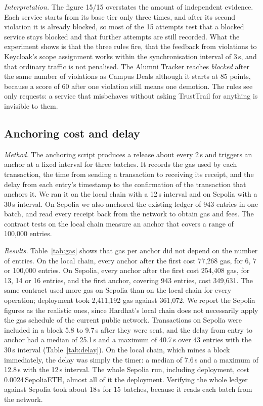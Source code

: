 \emph{Interpretation.} The figure 15/15 overstates the amount of independent evidence. Each service starts from its base tier only three times, and after its second violation it is already blocked, so most of the 15 attempts test that a blocked service stays blocked and that further attempts are still recorded. What the experiment shows is that the three rules fire, that the feedback from violations to Keycloak's scope assignment works within the synchronisation interval of 3\,s, and that ordinary traffic is not penalised. The Alumni Tracker reaches \emph{blocked} after the same number of violations as Campus Deals although it starts at 85 points, because a score of 60 after one violation still means one demotion. The rules see only requests: a service that misbehaves without asking TrustTrail for anything is invisible to them.

\subsection{Anchoring cost and delay}
\label{sec:eval-anchoring}
\emph{Method.} The anchoring script produces a release about every 2\,s and triggers an anchor at a fixed interval for three batches. It records the gas used by each transaction, the time from sending a transaction to receiving its receipt, and the delay from each entry's timestamp to the confirmation of the transaction that anchors it. We ran it on the local chain with a 12\,s interval and on Sepolia with a 30\,s interval. On Sepolia we also anchored the existing ledger of 943 entries in one batch, and read every receipt back from the network to obtain gas and fees. The contract tests on the local chain measure an anchor that covers a range of 100{,}000 entries.

\emph{Results.} Table~\ref{tab:gas} shows that gas per anchor did not depend on the number of entries. On the local chain, every anchor after the first cost 77{,}268 gas, for 6, 7 or 100{,}000 entries. On Sepolia, every anchor after the first cost 254{,}408 gas, for 13, 14 or 16 entries, and the first anchor, covering 943 entries, cost 349{,}631. The same contract used more gas on Sepolia than on the local chain for every operation; deployment took 2{,}411{,}192 gas against 361{,}072. We report the Sepolia figures as the realistic ones, since Hardhat's local chain does not necessarily apply the gas schedule of the current public network. Transactions on Sepolia were included in a block 5.8 to 9.7\,s after they were sent, and the delay from entry to anchor had a median of 25.1\,s and a maximum of 40.7\,s over 43 entries with the 30\,s interval (Table~\ref{tab:delay}). On the local chain, which mines a block immediately, the delay was simply the timer: a median of 7.6\,s and a maximum of 12.8\,s with the 12\,s interval. The whole Sepolia run, including deployment, cost 0.0024\,SepoliaETH, almost all of it the deployment. Verifying the whole ledger against Sepolia took about 18\,s for 15 batches, because it reads each batch from the network.

